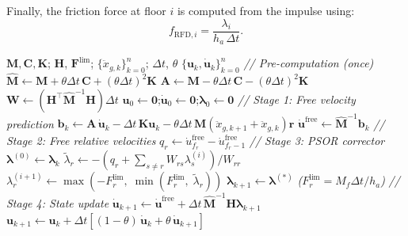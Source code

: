\documentclass[preprint,12pt,authoryear]{elsarticle}
\newcommand{\Mf}{M_{\!f}}
\newcommand{\ha}{h_a}
\begin{document}
Finally, the friction force at floor \(i\) is computed from the impulse using:
\begin{equation}
	f_{\mathrm{RFD},i} = \frac{\lambda_i}{\ha\,\Delta t}.
	\label{eq:ffrict}
\end{equation}

\begin{algorithm}[t]
	\caption{NSD-LCP-PSOR for multi-degree-of-freedom (MDOF) frames with RFDs}
	\label{alg:nsd-lcp-psor}
	\begin{algorithmic}[1]
		\Require $\bm{M},\bm{C},\bm{K}$; $\bm{H}$, $\bm{F}^{\lim}$; $\{\ddot{x}_{g,k}\}_{k=0}^{n}$; $\Delta t$, $\theta$
		\Ensure  $\{\bm{u}_k,\dot{\bm{u}}_k\}_{k=0}^{n}$
		\vspace{2pt}
		\State \textit{// Pre-computation (once)}
		\State $\hat{\bm{M}} \leftarrow \bm{M} + \theta\Delta t\,\bm{C} + (\theta\Delta t)^{2}\bm{K}$
		\State $\bm{A} \leftarrow \bm{M} - \theta\Delta t\,\bm{C} - (\theta\Delta t)^{2}\bm{K}$
		\State $\bm{W} \leftarrow \left(\bm{H}^{\top}\hat{\bm{M}}^{-1}\bm{H}\right)\Delta t$
		\State $\bm{u}_0 \leftarrow \bm{0}$;\quad $\dot{\bm{u}}_0 \leftarrow \bm{0}$;\quad $\bm{\lambda}_0 \leftarrow \bm{0}$
		\vspace{2pt}
		\State \textit{// Stage 1: Free velocity prediction}
		\State $\bm{b}_k \leftarrow \bm{A}\,\dot{\bm{u}}_k - \Delta t\,\bm{K}\bm{u}_k - \theta\Delta t\,\bm{M}\!\left(\ddot{x}_{g,k+1}+\ddot{x}_{g,k}\right)\bm{r}$
		\State $\dot{\bm{u}}^{\mathrm{free}} \leftarrow \hat{\bm{M}}^{-1}\bm{b}_k$
		\State \textit{// Stage 2: Free relative velocities}
		\State $q_r \leftarrow \dot{u}^{\mathrm{free}}_{f_r} - \dot{u}^{\mathrm{free}}_{f_r-1}$
		\EndFor
		\State \textit{// Stage 3: PSOR corrector}
		\State $\bm{\lambda}^{(0)} \leftarrow \bm{\lambda}_k$
		\State $\tilde{\lambda}_r \leftarrow -\!\left(q_r + \sum_{s \neq r} W_{rs}\lambda_s^{(i)}\right)\!\big/W_{rr}$
		\State $\lambda_r^{(i+1)} \leftarrow \max\!\left(-F^{\lim}_r,\;\min\!\left(F^{\lim}_r,\;\tilde{\lambda}_r\right)\right)$
		\EndFor
		\EndWhile
		\State $\bm{\lambda}_{k+1} \leftarrow \bm{\lambda}^{(*)}$
		\quad\textit{($F^{\lim}_r = \Mf\Delta t/\ha$)}
		\State \textit{// Stage 4: State update}
		\State $\dot{\bm{u}}_{k+1} \leftarrow \dot{\bm{u}}^{\mathrm{free}} + \Delta t\,\hat{\bm{M}}^{-1}\bm{H}\bm{\lambda}_{k+1}$
		\State $\bm{u}_{k+1} \leftarrow \bm{u}_k + \Delta t\!\left[(1-\theta)\,\dot{\bm{u}}_k + \theta\,\dot{\bm{u}}_{k+1}\right]$
		\EndFor
	\end{algorithmic}
\end{algorithm}
\end{document}
